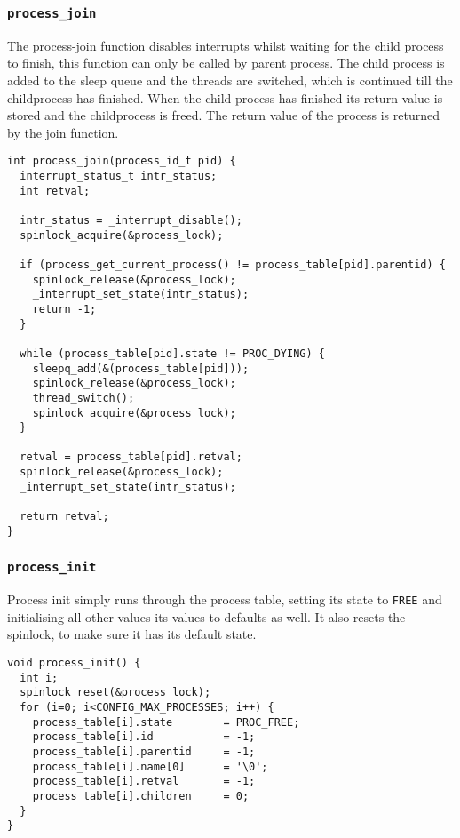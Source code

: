 \documentclass[a4paper,12pt]{article}
\begin{document}
\subsubsection{\texttt{process\_join}}
The process-join function disables interrupts whilst waiting for the child process to finish, this function can only be called by parent process. The child process is added to the sleep queue and the threads are switched, which is continued till the childprocess has finished. When the child process has finished its return value is stored and the childprocess is freed. The return value of the process is returned by the join function.

\begin{lstlisting}
int process_join(process_id_t pid) {
  interrupt_status_t intr_status;
  int retval;

  intr_status = _interrupt_disable();
  spinlock_acquire(&process_lock);

  if (process_get_current_process() != process_table[pid].parentid) {
    spinlock_release(&process_lock);
    _interrupt_set_state(intr_status);
    return -1;
  }

  while (process_table[pid].state != PROC_DYING) {
    sleepq_add(&(process_table[pid]));
    spinlock_release(&process_lock);
    thread_switch();
    spinlock_acquire(&process_lock);
  }

  retval = process_table[pid].retval;
  spinlock_release(&process_lock);
  _interrupt_set_state(intr_status);

  return retval;
} 
\end{lstlisting}

\subsubsection{\texttt{process\_init}}
Process init simply runs through the process table, setting its state to \texttt{FREE} and initialising all other values its values to defaults as well. It also resets the spinlock, to make sure it has its default state.
\begin{lstlisting}
void process_init() {
  int i;
  spinlock_reset(&process_lock);
  for (i=0; i<CONFIG_MAX_PROCESSES; i++) {
    process_table[i].state        = PROC_FREE;
    process_table[i].id           = -1;
    process_table[i].parentid     = -1;
    process_table[i].name[0]      = '\0'; 
    process_table[i].retval       = -1;
    process_table[i].children     = 0;
  }
}
\end{lstlisting}
\end{document}
